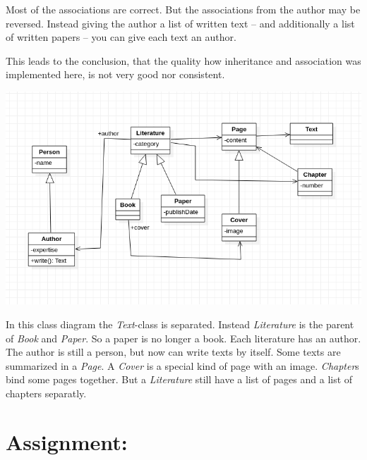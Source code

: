 \documentclass[a4paper,12pt,oneside]{scrreprt}
\begin{document}
    Most of the associations are correct. But the associations from the author may be reversed. Instead giving the author a list of written text -- and additionally a list of written papers -- you can give each text an author.
    
    This leads to the conclusion, that the quality how inheritance and
    association was implemented here, is not very good nor consistent.
    
    \includegraphics[width=\textwidth]{../uml/2_2.png}
    
    In this class diagram the \textit{Text}-class is separated. Instead \textit{Literature} is the parent of \textit{Book} and \textit{Paper}. So a paper is no longer a book. Each literature has an author. The author is still a person, but now can write texts by itself. Some texts are summarized in a \textit{Page}. A \textit{Cover} is a special kind of page with an image. \textit{Chapter}s bind some pages together. But a \textit{Literature} still have a list of pages and a list of chapters separatly.
    
	\section{Assignment:}
    
\end{document}
